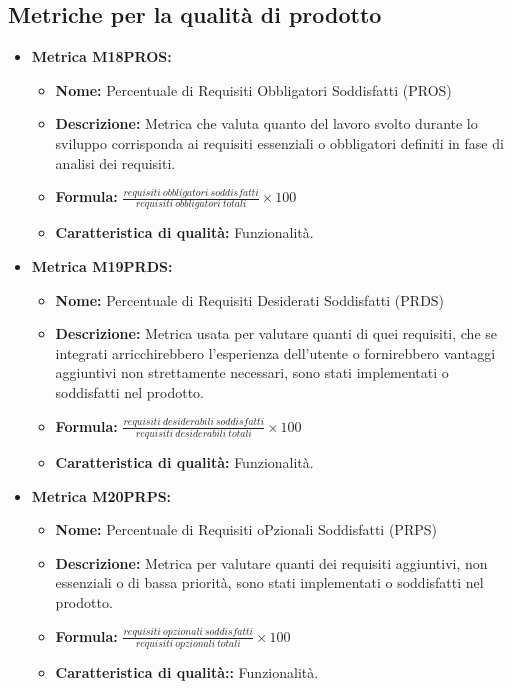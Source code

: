 \subsection{Metriche per la qualità di prodotto}
\begin{itemize}
    
    \item \textbf{Metrica M18PROS:}
    \begin{itemize}
     \item \textbf{Nome:} Percentuale di Requisiti Obbligatori Soddisfatti (PROS)
     \item \textbf{Descrizione:} Metrica che valuta quanto del lavoro svolto durante lo sviluppo corrisponda ai requisiti essenziali o obbligatori definiti in fase di analisi dei requisiti.
     \item \textbf{Formula:} $\frac{requisiti \ obbligatori \ soddisfatti}{requisiti \ obbligatori \ totali}\times 100$
     \item \textbf{Caratteristica di qualità:} Funzionalità.
    \end{itemize}

    \item \textbf{Metrica M19PRDS:}
    \begin{itemize}
     \item \textbf{Nome:} Percentuale di Requisiti Desiderati Soddisfatti (PRDS)
     \item \textbf{Descrizione:} Metrica usata per valutare quanti di quei requisiti, che se integrati arricchirebbero l'esperienza dell'utente o fornirebbero vantaggi aggiuntivi non strettamente necessari, sono stati implementati o soddisfatti nel prodotto.
     \item \textbf{Formula:} $\frac{requisiti \ desiderabili \ soddisfatti}{requisiti \ desiderabili \ totali}\times 100$
     \item \textbf{Caratteristica di qualità:} Funzionalità.
    \end{itemize}

    \item \textbf{Metrica M20PRPS:}
    \begin{itemize}
     \item \textbf{Nome:} Percentuale di Requisiti oPzionali Soddisfatti (PRPS)
     \item \textbf{Descrizione:} Metrica per valutare quanti dei requisiti aggiuntivi, non essenziali o di bassa priorità, sono stati implementati o soddisfatti nel prodotto.
     \item \textbf{Formula:} $\frac{requisiti \ opzionali \ soddisfatti}{requisiti \ opzionali \ totali}\times 100$
     \item \textbf{Caratteristica di qualità::} Funzionalità.
    \end{itemize}


\end{itemize}
